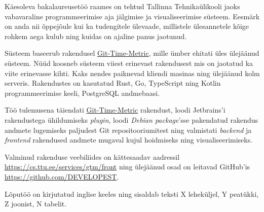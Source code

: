 Käesoleva bakalaureusetöö raames on tehtud Tallinna Tehnikaülikooli jaoks vabavaraline programmeerimise aja jälgimise ja visualiseerimise süsteem.
Eesmärk on anda nii õppejõule kui ka tudengitele ülevaade, millistele ülesannetele kõige rohkem aega kulub ning
kuidas on ajaline panus jaotunud.

Süsteem baseerub rakendusel \href{https://github.com/git-time-metric/gtm}{Git-Time-Metric}, mille ümber
ehitati üles ülejäänud süsteem.
Nüüd koosneb süsteem viiest erinevast rakendusest mis on jaotatud ka viite erinevasse kihti.
Kaks nendes paiknevad kliendi masinas ning ülejäänud kolm serveris.
Rakendustes on kasutatud Rust, Go, TypeScript ning Kotlin programmeerimise keeli, PostgreSQL andmebaasi.

Töö tulemusena täiendati \href{https://github.com/git-time-metric/gtm}{Git-Time-Metric} rakendust,
loodi Jetbrains'i rakendustega ühildumiseks \textit{plugin},
loodi \textit{Debian package}'sse pakendatud rakendus andmete lugemiseks paljudest Git repositooriumitest ning
valmistati \textit{backend} ja \textit{frontend} rakendused andmete mugaval kujul hoidmiseks ning visualiseerimiseks.

Valminud rakenduse veebiliides on kättesaadav aadressil \href{https://cs.ttu.ee/services/gtm/front}{https://cs.ttu.ee/services/gtm/front}
ning ülejäänud osad on leitavad GitHub'is \href{https://github.com/DEVELOPEST}{https://github.com/DEVELOPEST}.

Lõputöö on kirjutatud inglise keeles ning sisaldab teksti X leheküljel, Y peatükki, Z joonist, N tabelit.